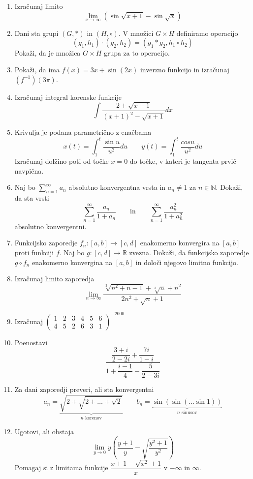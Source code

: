 \documentclass[a4paper,12pt]{article}
\begin{document}
\begin{enumerate}
\item Izračunaj limito
%
\[
\lim\limits_{x \to \infty} (\sin \sqrt{x+1}-\sin \sqrt{x})    
\]

\item Dani sta grupi $(G,*)$ in $(H,\circ)$. V množici $G \times H$ definiramo operacijo
%
\[
(g_1,h_1)\cdot (g_2,h_2)=(g_1*g_2,h_1 \circ h_2)   
\]
%
Pokaži, da je množica $G\times H$ grupa za to operacijo.

\item Pokaži, da ima $f(x) = 3x + \sin{(2x)}$ inverzno funkcijo in izračunaj $(f^{-1})(3\pi)$.

\item Izračunaj integral korenske funkcije
\[
\int \frac{2 + \sqrt{x+1}}{(x+1)^2 - \sqrt{x+1}}dx    
\]
\item Krivulja je podana parametrično z enačbama
%
\[
    x(t)=\int_1^t \frac{\sin{u}}{u^2}du \qquad y(t)=\int_1^t \frac{cos{u}}{u^2}du
\]
%
Izračunaj dolžino poti od točke $x=0$ do točke, v kateri je tangenta prvič navpična.

\item Naj bo $\sum_{n=1}^\infty a_n$ absolutno konvergentna vrsta in $a_n \neq 1$ za $n \in \mathbb{N}$.
Dokaži, da sta vrsti
%
\[
    \sum_{n=1}^\infty \frac{a_n}{1+a_n} \qquad \text{in} \qquad \sum_{n=1}^\infty \frac{a_n^2}{1+a_n^2}    
\]
%
absolutno konvergentni.

\item Funkcijsko zaporedje $f_n: [a,b] \rightarrow [c,d]$ enakomerno konvergira na $[a,b]$ proti funkciji $f$.
Naj bo $g : [c,d] \rightarrow \mathbb{R}$ zvezna. Dokaži, da funkcijsko zaporedje $g \circ f_n$
enakomerno konvergina na $[a,b]$ in določi njegovo limitno funkcijo.

\item Izračunaj limito zaporedja
%
\[
\lim \limits_{n \to \infty} \frac{\sqrt[3]{n^2 + n -1}+\sqrt[3]{n}+n^2}{2n^2+\sqrt{n}+1}   
\]
%
\item Izračunaj $
\begin{pmatrix}
    1 & 2 & 3 & 4 & 5 & 6 \\
    4 & 5 & 2 & 6 & 3 & 1
\end{pmatrix}
^{-2000}
$

\item Poenostavi
%
\[
\frac{\dfrac{3+i}{2-2i}+\dfrac{7i}{1-i}}{1+\dfrac{i-1}{4}-\dfrac{5}{2-3i}}   
\]
%
\item Za dani zaporedji preveri, ali sta konvergentni
%
\[
a_n = \underbrace{\sqrt{2+\sqrt{2+\ldots+\sqrt{2}}}}_{n \text{ korenov}} \qquad b_n=\underbrace{\sin{(\sin{(\ldots \sin{1})})}}_{n \text{ sinusov}}
\]
%
\item Ugotovi, ali obstaja
%
\[
\lim \limits_{y \to 0} y \left(\frac{y+1}{y}-\sqrt{\frac{y^2+1}{y^2}} \right)
\]
%
Pomagaj si z limitama funkcije $\dfrac{x+1-\sqrt{x^2}+1}{x}$ v $-\infty$ in $\infty$.


\end{enumerate}
\end{document}
